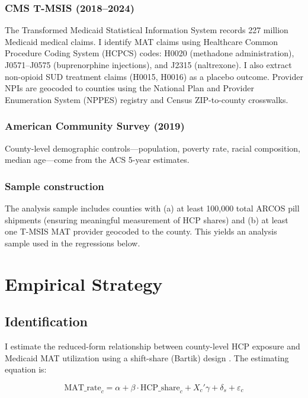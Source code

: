 \documentclass[12pt]{article}
\begin{document}
\subsubsection*{CMS T-MSIS (2018--2024)}  The Transformed Medicaid Statistical Information System records 227 million Medicaid medical claims. I identify MAT claims using Healthcare Common Procedure Coding System (HCPCS) codes: H0020 (methadone administration), J0571--J0575 (buprenorphine injections), and J2315 (naltrexone). I also extract non-opioid SUD treatment claims (H0015, H0016) as a placebo outcome. Provider NPIs are geocoded to counties using the National Plan and Provider Enumeration System (NPPES) registry and Census ZIP-to-county crosswalks.

\subsubsection*{American Community Survey (2019)}  County-level demographic controls---population, poverty rate, racial composition, median age---come from the ACS 5-year estimates.

\subsubsection*{Sample construction}  The analysis sample includes counties with (a) at least 100,000 total ARCOS pill shipments (ensuring meaningful measurement of HCP shares) and (b) at least one T-MSIS MAT provider geocoded to the county. This yields an analysis sample used in the regressions below.



\section{Empirical Strategy}

\subsection{Identification}

I estimate the reduced-form relationship between county-level HCP exposure and Medicaid MAT utilization using a shift-share (Bartik) design \citep{borusyak2022revisiting, goldstein2016bartik}. The estimating equation is:

\begin{equation}
\text{MAT\_rate}_c = \alpha + \beta \cdot \text{HCP\_share}_c + X_c'\gamma + \delta_s + \varepsilon_c
\label{eq:main}
\end{equation}
\end{document}
